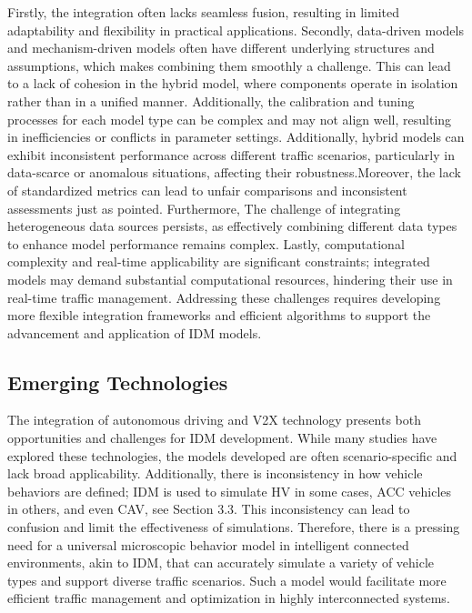 \documentclass[a4paper,fleqn]{cas-sc}
\begin{document}
Firstly, the integration often lacks seamless fusion, resulting in limited adaptability and flexibility in practical applications. Secondly, data-driven models and mechanism-driven models often have different underlying structures and assumptions, which makes combining them smoothly a challenge. This can lead to a lack of cohesion in the hybrid model, where components operate in isolation rather than in a unified manner. Additionally, the calibration and tuning processes for each model type can be complex and may not align well, resulting in inefficiencies or conflicts in parameter settings.  Additionally, hybrid models can exhibit inconsistent performance across different traffic scenarios, particularly in data-scarce or anomalous situations, affecting their robustness.Moreover, the lack of standardized metrics can lead to unfair comparisons and inconsistent assessments just as \cite{wangComparingHundredsMachineLearning2024} pointed.  Furthermore, The challenge of integrating heterogeneous data sources persists, as effectively combining different data types to enhance model performance remains complex. Lastly, computational complexity and real-time applicability are significant constraints; integrated models may demand substantial computational resources, hindering their use in real-time traffic management. Addressing these challenges requires developing more flexible integration frameworks and efficient algorithms to support the advancement and application of IDM models.


\subsection{Emerging Technologies}

The integration of autonomous driving and V2X technology presents both opportunities and challenges for IDM development. While many studies have explored these technologies, the models developed are often scenario-specific and lack broad applicability. Additionally, there is inconsistency in how vehicle behaviors are defined; IDM is used to simulate HV in some cases, ACC vehicles in others, and even CAV, see Section 3.3. This inconsistency can lead to confusion and limit the effectiveness of simulations. Therefore, there is a pressing need for a universal microscopic behavior model in intelligent connected environments, akin to IDM, that can accurately simulate a variety of vehicle types and support diverse traffic scenarios. Such a model would facilitate more efficient traffic management and optimization in highly interconnected systems.
\end{document}
